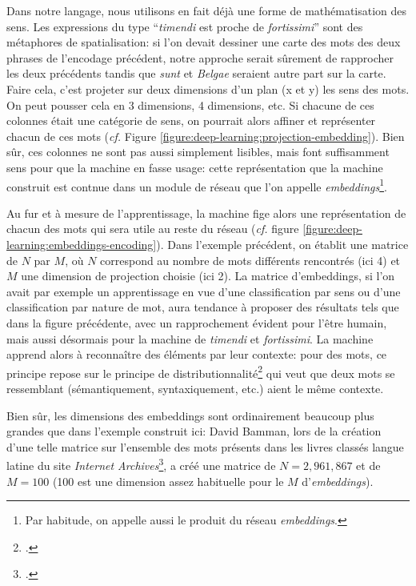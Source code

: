 Dans notre langage, nous utilisons en fait déjà une forme de mathématisation des sens. Les expressions du type \enquote{\textit{timendi} est proche de \textit{fortissimi}} sont des métaphores de spatialisation: si l'on devait dessiner une carte des mots des deux phrases de l'encodage précédent, notre approche serait sûrement de rapprocher les deux précédents tandis que \textit{sunt} et \textit{Belgae} seraient autre part sur la carte. Faire cela, c'est projeter sur deux dimensions d'un plan (x et y) les sens des mots. On peut pousser cela en 3 dimensions, 4 dimensions, etc. Si chacune de ces colonnes était une catégorie de sens, on pourrait alors affiner et représenter chacun de ces mots (\textit{cf.} Figure \ref{figure:deep-learning:projection-embedding}). Bien sûr, ces colonnes ne sont pas aussi simplement lisibles, mais font suffisamment sens pour que la machine en fasse usage: cette représentation que la machine construit est contnue dans un module de réseau que l'on appelle \textit{embeddings}\footnote{Par habitude, on appelle aussi le produit du réseau \textit{embeddings}.}. 

Au fur et à mesure de l'apprentissage, la machine fige alors une représentation de chacun des mots qui sera utile au reste du réseau (\textit{cf.} figure \ref{figure:deep-learning:embeddings-encoding}). Dans l'exemple précédent, on établit une matrice de $N$ par $M$, où $N$ correspond au nombre de mots différents rencontrés (ici 4) et $M$ une dimension de projection choisie (ici 2). La matrice d'embeddings, si l'on avait par exemple un apprentissage en vue d'une classification par sens ou d'une classification par nature de mot, aura tendance à proposer des résultats tels que dans la figure précédente, avec un rapprochement évident pour l'être humain, mais aussi désormais pour la machine de \textit{timendi} et \textit{fortissimi}. La machine apprend alors à reconnaître des éléments par leur contexte: pour des mots, ce principe repose sur le principe de distributionnalité\footcite{firth_papers_1957} qui veut que deux mots se ressemblant (sémantiquement, syntaxiquement, etc.) aient le même contexte.







Bien sûr, les dimensions des embeddings sont ordinairement beaucoup plus grandes que dans l'exemple construit ici: David Bamman, lors de la création d'une telle matrice sur l'ensemble des mots présents dans les livres classés langue latine du site \textit{Internet Archives}\footcite{bamman_11k_2012}, a créé une matrice de $N=2,961,867$ et de $M=100$ (100 est une dimension assez habituelle pour le $M$ d'\textit{embeddings}). 

